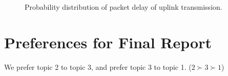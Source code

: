 \documentclass{article}
\begin{document}
\begin{figure}[htbp]
\centering
{}
\caption{Probability distribution of packet delay of uplink transmission.}
\label{figure: uplink delay cdf}
\end{figure}


\section{Preferences for Final Report}
We prefer topic 2 to topic 3, and prefer topic 3 to topic 1. ($2 \succ 3 \succ 1$)
\end{document}
